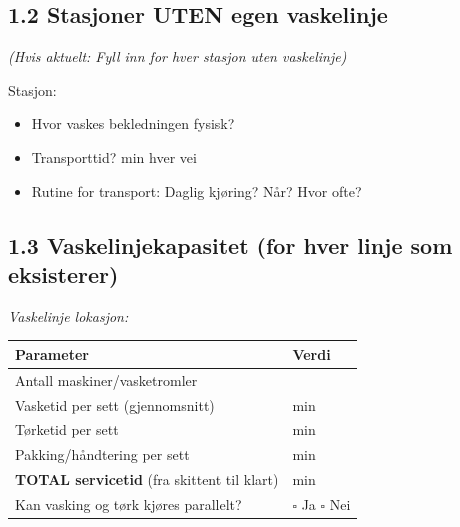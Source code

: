\documentclass[12pt, a4paper, norsk]{article}
\begin{document}
\vspace{0.5cm}

\subsection*{1.2 Stasjoner UTEN egen vaskelinje}

\noindent
\textit{(Hvis aktuelt: Fyll inn for hver stasjon uten vaskelinje)}

\vspace{0.3cm}

\noindent
Stasjon: \underline{\hspace{4cm}}

\begin{itemize}
\item[\textbf{Q:}] Hvor vaskes bekledningen fysisk? 
  \newline\underline{\hspace{12cm}}

\item[\textbf{Q:}] Transporttid? \underline{\hspace{2cm}} min hver vei

\item[\textbf{Q:}] Rutine for transport: Daglig kjøring? Når? Hvor ofte?
  \newline\underline{\hspace{12cm}}
\end{itemize}

\vspace{0.3cm}

\subsection*{1.3 Vaskelinjekapasitet (for hver linje som eksisterer)}

\noindent
\textit{Vaskelinje lokasjon:} \underline{\hspace{7cm}}

\vspace{0.3cm}

\begin{center}
\begin{tabular}{|l|l|}
\hline
\textbf{Parameter} & \textbf{Verdi} \\
\hline
Antall maskiner/vasketromler & \underline{\hspace{6cm}} \\
\hline
Vasketid per sett (gjennomsnitt) & \underline{\hspace{6cm}} min \\
\hline
Tørketid per sett & \underline{\hspace{6cm}} min \\
\hline
Pakking/håndtering per sett & \underline{\hspace{6cm}} min \\
\hline
\textbf{TOTAL servicetid} (fra skittent til klart) & \underline{\hspace{6cm}} min \\
\hline
Kan vasking og tørk kjøres parallelt? & $\square$ Ja $\square$ Nei \\
\hline
\end{tabular}
\end{center}
\end{document}
